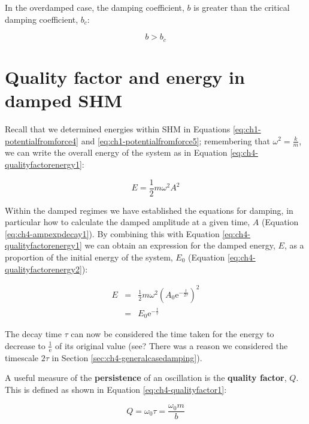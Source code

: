 \documentclass[
]{book}
\begin{document}
In the overdamped case, the damping coefficient, \(b\) is greater than the critical damping coefficient, \(b_c\):

\begin{equation}
b > b_c
\end{equation}

\hypertarget{sec:ch4-qualityfactor}{%
\section{Quality factor and energy in damped SHM}\label{sec:ch4-qualityfactor}}

Recall that we determined energies within SHM in Equations \eqref{eq:ch1-potentialfromforce4} and \eqref{eq:ch1-potentialfromforce5}; remembering that \(\omega^2 = \frac{k}{m}\), we can write the overall energy of the system as in Equation \eqref{eq:ch4-qualityfactorenergy1}:

\begin{equation}
E = \frac{1}{2}m\omega^2 A^2
\label{eq:ch4-qualityfactorenergy1}
\end{equation}

Within the damped regimes we have established the equations for damping, in particular how to calculate the damped amplitude at a given time, \(A\) (Equation \eqref{eq:ch4-ampexpdecay1}). By combining this with Equation \eqref{eq:ch4-qualityfactorenergy1} we can obtain an expression for the damped energy, \(E\), as a proportion of the initial energy of the system, \(E_0\) (Equation \eqref{eq:ch4-qualityfactorenergy2}):

\begin{equation}
\begin{array}{rcl}
E &=& \frac{1}{2}m\omega^2 \left( A_0 \mathrm{e}^{-\frac{t}{2\tau}} \right)^2\\
 &=& E_0 \mathrm{e}^{-\frac{t}{\tau}}
\end{array}
\label{eq:ch4-qualityfactorenergy2}
\end{equation}

The decay time \(\tau\) can now be considered the time taken for the energy to decrease to \(\frac{1}{\mathrm{e}}\) of its original value (see? There was a reason we considered the timescale \(2\tau\) in Section \ref{sec:ch4-generalcasedamping}).

A useful measure of the \textbf{persistence} of an oscillation is the \textbf{quality factor}, \(Q\). This is defined as shown in Equation \eqref{eq:ch4-qualityfactor1}:

\begin{equation}
Q = \omega_0 \tau = \frac{\omega_0 m}{b}
\label{eq:ch4-qualityfactor1}
\end{equation}
\end{document}
